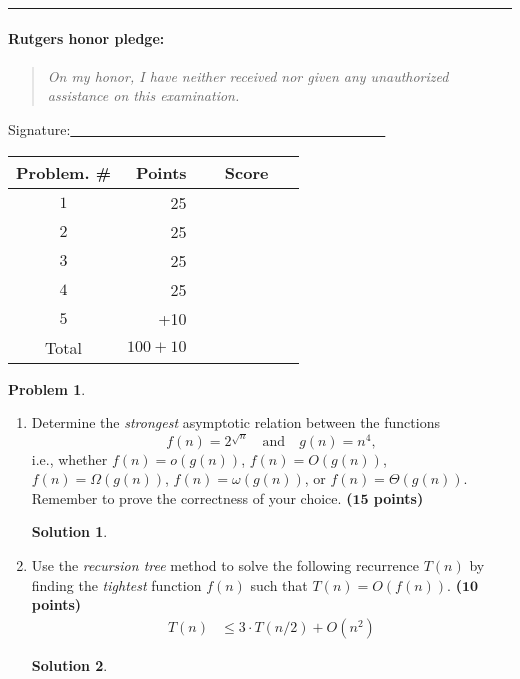 \documentclass{article}
\theoremstyle{definition}
\newtheorem{problem}{Problem}
\def\fline{\rule{0.75\linewidth}{0.5pt}}
\newcommand{\finishline}{\vspace{-15pt}\begin{center}\fline\end{center}}
\newtheorem*{solution*}{Solution}
\newenvironment{solution}{\begin{solution*}}{{} \end{solution*}}
\newcommand{\grade}[1]{\hfill{\textbf{($\mathbf{#1}$ points)}}}
\begin{document}
\finishline

\paragraph{Rutgers honor pledge:} 

\begin{quote}
\emph{On my honor, I have neither received nor given any unauthorized assistance on this
examination.} 
\end{quote}
\hfill{Signature:\underline{~~~~~~~~~~~~~~~~~~~~~~~~~~~~~~~~~~~~~~~~~~~~~}}

\bigskip

\begin{center}
\begin{tabular}{|c|r|c|}
\hline
Problem. \# & Points & Score \\ \hline\hline
$1$ & 25 & ~~~~~~~~~~~\\  \hline
$2$ & 25 & \\ \hline
$3$ & 25 & \\ \hline
$4$ & 25 & \\ \hline
$5$ & +10 & \\ \hline
Total & $100 + 10$ & \\ \hline
\end{tabular}
\end{center}

\newpage

\begin{problem}\label{basics}~
\begin{enumerate}[label=(\alph*)]
	\item  Determine the \emph{strongest} asymptotic relation between the functions 
	\[
	f(n) = 2^{\sqrt{n}} \quad \text{and} \quad g(n) = n^4,
	\]
	i.e., whether $f(n) = o(g(n))$, $f(n) = O(g(n))$, $f(n) = \Omega(g(n))$, $f(n) = \omega(g(n))$, or $f(n) = \Theta(g(n))$. 
	Remember to prove the correctness of your choice. \grade{15}

\smallskip
\begin{solution}
\end{solution}

	\newpage
	\item Use the \emph{recursion tree} method to solve the following recurrence $T(n)$ by finding the \emph{tightest} function $f(n)$ such that $T(n) = O(f(n))$.   \grade{10}
	\begin{align*}
		T(n) &\leq 3 \cdot T(n/2) + O(n^2) 
	\end{align*} 
	
	
\smallskip
\begin{solution}
\end{solution}


	\vspace*{\fill}
\end{enumerate}
\end{problem}
\end{document}
